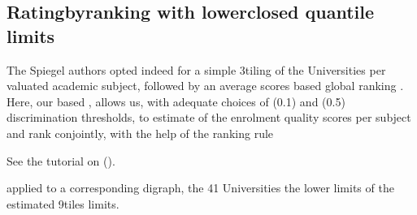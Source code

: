 \documentclass[a4paper,12pt,english]{sphinxhowto}
\begin{document}
\subsection{Rating\sphinxhyphen{}by\sphinxhyphen{}ranking with lower\sphinxhyphen{}closed quantile limits}
\label{\detokenize{tutorial:rating-by-ranking-with-lower-closed-quantile-limits}}
The Spiegel authors opted indeed for a simple 3\sphinxhyphen{}tiling of the Universities per valuated academic subject, followed by an average  scores based global ranking \sphinxfootnotemark[29]. Here, our  based , allows us, with adequate choices of  (0.1) and  (0.5) discrimination thresholds, to estimate  of the enrolment quality scores per subject and rank conjointly, with the help of the  ranking rule %
\begin{footnote}[34]\sphinxAtStartFootnote
See the tutorial on {\hyperref[\detokenize{tutorial:ranking-tutorial-label}]{}} ().
%
\end{footnote} applied to a corresponding  digraph, the 41 Universities  the lower limits of the estimated 9\sphinxhyphen{}tiles limits.
\end{document}
